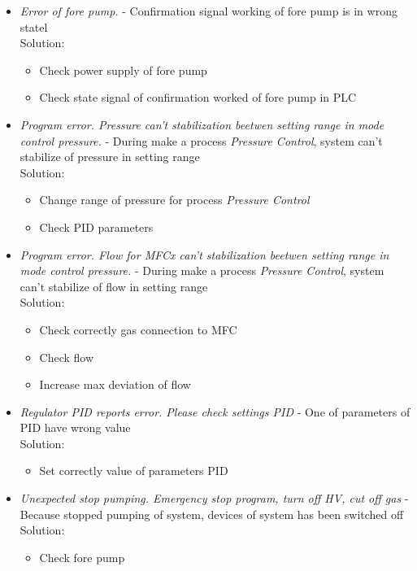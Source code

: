 \begin{itemize}
	\item \textit{Error of fore pump.} - Confirmation signal working of fore pump is in wrong statel \\
 		Solution:
		\begin{itemize}
			\item Check power supply of fore pump  
			\item Check state signal of confirmation worked of fore pump in PLC
		\end{itemize}

	\item \textit{Program error. Pressure can't stabilization beetwen setting range in mode control pressure.} - During make a process  \textit{Pressure Control}, system can't stabilize of pressure in setting range \\
 		Solution:
		\begin{itemize}
			\item Change range of pressure for process \textit{Pressure Control} 
			\item Check PID parameters
		\end{itemize}

	\item \textit{Program error. Flow for MFCx can't stabilization beetwen setting range in mode control pressure.} -  During make a process  \textit{Pressure Control}, system can't stabilize of flow in setting range \\
 		Solution:
		\begin{itemize}
			\item Check correctly  gas connection to MFC 
			\item Check  flow 
			\item Increase max deviation of flow
		\end{itemize}

	\item \textit{Regulator PID reports error. Please check settings PID} - One of parameters of PID have wrong value \\
 		Solution:
		\begin{itemize}
			 \item Set correctly value of parameters PID
		\end{itemize}

	\item \textit{Unexpected stop pumping. Emergency stop program, turn off HV, cut off gas} - Because stopped pumping of system, devices of system has been switched off  \\
 		Solution:
		\begin{itemize}
			\item Check fore pump
		\end{itemize}


\end{itemize}
